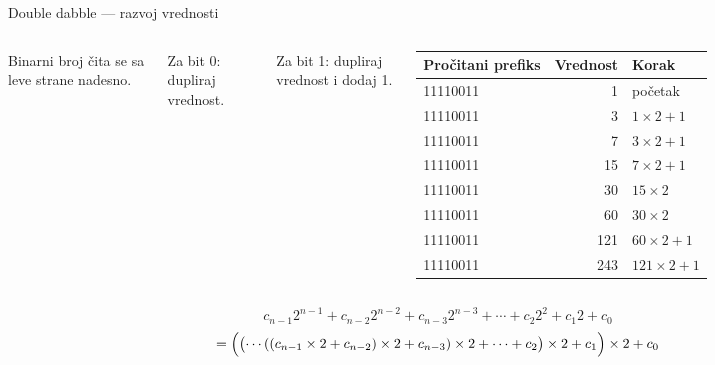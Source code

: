 \begin{frame}[label=06-s008]{Double dabble — razvoj vrednosti}
\vspace{1.5mm}
\fontsize{10}{12}\selectfont\setlength{\abovedisplayskip}{3pt}\setlength{\belowdisplayskip}{3pt}
\begin{columns}[T,onlytextwidth]
Binarni broj čita se sa leve strane nadesno.\par\medskip
Za bit 0: dupliraj vrednost.\par\medskip
Za bit 1: dupliraj vrednost i dodaj 1.
\centering
\renewcommand{\arraystretch}{1.15}
\begin{tabular}{@{}lrl@{}}Pročitani prefiks & Vrednost & Korak\\\midrule
\textcolor{DEcrvena}{1}1110011 & 1 & početak\\
\textcolor{DEcrvena}{11}110011 & 3 & $1\times2+1$\\
\textcolor{DEcrvena}{111}10011 & 7 & $3\times2+1$\\
\textcolor{DEcrvena}{1111}0011 & 15 & $7\times2+1$\\
\textcolor{DEcrvena}{11110}011 & 30 & $15\times2$\\
\textcolor{DEcrvena}{111100}11 & 60 & $30\times2$\\
\textcolor{DEcrvena}{1111001}1 & 121 & $60\times2+1$\\
\textcolor{DEcrvena}{11110011} & 243 & $121\times2+1$\\\bottomrule
\end{tabular}
\end{columns}\medskip
\[c_{n-1}2^{n-1}+c_{n-2}2^{n-2}+c_{n-3}2^{n-3}+\cdots+c_2 2^2+c_1 2+c_0\]
\[=\Bigl(\bigl(\cdots((c_{n-1}\times2+c_{n-2})\times2+c_{n-3})\times2+\cdots+c_2\bigr)\times2+c_1\Bigr)\times2+c_0\]
\end{frame}
